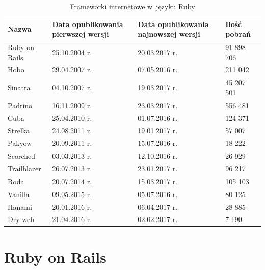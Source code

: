 \documentclass[printmode]{mgr}
\begin{document}
\begin{table}[H]
  \caption{ Frameworki internetowe w~języku Ruby \protect\footnotemark}
  \centering
  \begin{tabularx}{1\linewidth}{|X|X|X|X|} \hline
    Nazwa & Data opublikowania \newline pierwszej wersji & Data opublikowania \newline  najnowszej wersji & Ilość pobrań \\ \hline
    \rowcolor{lightgray}
    Ruby on Rails & 25.10.2004 r. & 20.03.2017 r. & 91 898 706 \\ \hline
    Hobo & 29.04.2007 r. & 07.05.2016 r. & 211 042 \\ \hline
    Sinatra & 04.10.2007 r. & 19.03.2017 r. & 45 207 501 \\ \hline
    Padrino & 16.11.2009 r. & 23.03.2017 r. & 556 481 \\ \hline
    Cuba & 25.04.2010 r. & 01.07.2016 r. & 124 371 \\ \hline
    Strelka & 24.08.2011 r. & 19.01.2017 r. & 57 007 \\ \hline
    Pakyow & 20.09.2011 r. & 15.07.2016 r. & 18 222 \\ \Xhline{4\arrayrulewidth}
    Scorched & 03.03.2013 r. & 12.10.2016 r. & 26 929 \\ \hline
    Trailblazer & 26.07.2013 r. & 23.01.2017 r. & 96 217 \\ \hline
    \rowcolor{lightgray}
    Roda & 20.07.2014 r. & 15.03.2017 r. & 105 103 \\ \hline
    Vanilla & 09.05.2015 r. & 05.07.2016 r. & 80 125 \\ \Xhline{4\arrayrulewidth}
    \rowcolor{lightgray}
    Hanami & 20.01.2016 r. & 06.04.2017 r. & 28 885 \\ \hline
    Dry-web & 21.04.2016 r. & 02.02.2017 r. & 7 190 \\ \hline
  \end{tabularx}
\end{table}

\section{Ruby on Rails}
\end{document}
